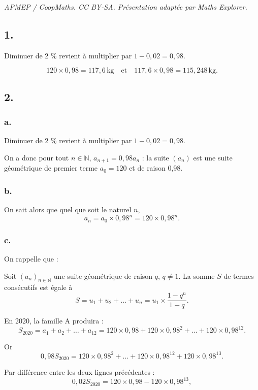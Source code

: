 \documentclass[10pt]{article}
\begin{document}
\noindent\textit{APMEP / CoopMaths. CC BY-SA. Présentation adaptée par Maths Explorer.}\par\medskip
\subsection*{1.}
	
	Diminuer de 2 \% revient à multiplier par \(1 - 0,02 = 0,98\).
	
	\[
	120 \times 0,98 = 117,6 \, \text{kg} \quad \text{et} \quad 117,6 \times 0,98 = 115,248 \, \text{kg}.
	\]
	
	\subsection*{2.}
	\subsubsection*{a.}
	Diminuer de 2 \% revient à multiplier par \(1 - 0,02 = 0,98\).
	
	On a donc pour tout \(n \in \mathbb{N}\), \(a_{n+1} = 0,98a_n\) : la suite \((a_n)\) est une suite géométrique de premier terme \(a_0 = 120\) et de raison 0,98.
	
	\subsubsection*{b.}
	
	On sait alors que quel que soit le naturel \(n\),
	\[
	a_n = a_0 \times 0,98^n = 120 \times 0,98^n.
	\]
	
	\subsubsection*{c.}
	
	On rappelle que :
	
	Soit \((a_n)_{n \in \mathbb{N}}\) une suite géométrique de raison \(q\), \(q \neq 1\). La somme \(S\) de termes consécutifs est égale à
	\[
	S = u_1 + u_2 + \ldots + u_n = u_1 \times \dfrac{1 - q^n}{1 - q}.
	\]
	
	En 2020, la famille A produira :
	\[
	S_{2020} = a_1 + a_2 + \ldots + a_{12} = 120 \times 0,98 + 120 \times 0,98^2 + \ldots + 120 \times 0,98^{12}.
	\]
	
	Or
	\[
	0,98S_{2020} = 120 \times 0,98^2 + \ldots + 120 \times 0,98^{12} + 120 \times 0,98^{13}.
	\]
	
	Par différence entre les deux lignes précédentes :
	\[
	0,02S_{2020} = 120 \times 0,98 - 120 \times 0,98^{13},
	\]
	
\end{document}
